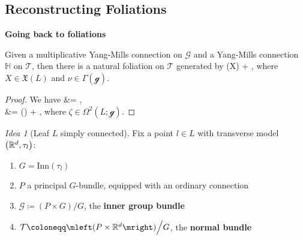 \documentclass[hyperref={pdfpagelabels=false}]{beamer}
\def\bas#1\eas{\begin{align*}#1\end{align*}}
\theoremstyle{plain}
\theoremstyle{remark}
\newtheorem*{idea}{Idea}
\begin{document}
\subsection{Reconstructing Foliations}
{

\begin{frame}
\thispagestyle{empty}
\begin{center}
\textbf{\Large Going back to foliations}
\end{center}
\end{frame}

\begin{frame}
\begin{theorem}[{[C.\ L.-G., S.-R.\ F.]}]
Given a multiplicative Yang-Mills connection on $\mathcal{G}$ and a Yang-Mills connection $\mathbb{H}$ on $\mathcal{T}$, then there is a natural foliation on $\mathcal{T}$ generated by 
\bas
\mathbb{H}(X) + \overline{\nu},
\eas
where $X \in \mathfrak{X}(L)$ and $\nu \in \Gamma(\mathcal{g})$.
\end{theorem}
\pause
\begin{proof}
We have
\bas
\mleft[ \mathbb{H}(X), \overline{\nu} \mright]
&=
,
\\
&=
\mleft(\mright)
	+ ,
\eas
where $\zeta \in \Omega^2(L; \mathcal{g})$.	
\end{proof}
\end{frame}

\begin{frame}
\begin{idea}[Leaf $L$ simply connected]
Fix a point $l \in L$ with transverse model $\mleft(\mathbb{R}^d, \tau_l\mright)$:
\begin{enumerate}
	\item $G = \mathrm{Inn}(\tau_l)$
	\pause
	\item $P$ a principal $G$-bundle, equipped with an ordinary connection
	\pause
	\item $\mathcal{G} \coloneqq (P \times G) \Big/ G$, the \textbf{inner group bundle}
	\pause
	\item $\mathcal{T} \coloneqq \mleft(P \times \mathbb{R}^d\mright) \Big/ G$, the \textbf{normal bundle}
\end{enumerate}
\end{idea}

\pause


\end{frame}}
\end{document}
